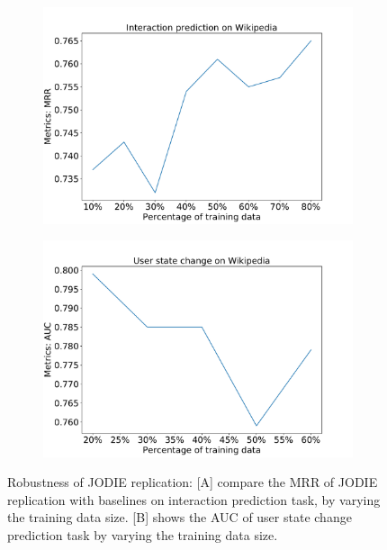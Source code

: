 


\begin{figure}
	\centering
    \begin{subfigure}[b]{0.49\textwidth}
        \includegraphics[width=1\textwidth]{image/wiki.pdf}
    \end{subfigure}
    \begin{subfigure}[b]{0.49\textwidth}
        \includegraphics[width=1\textwidth]{image/wiki_state.pdf}
    \end{subfigure}

    \caption{Robustness of JODIE replication: [A] compare the MRR of JODIE replication with baselines on interaction prediction task, by varying the training data size. [B] shows the AUC of user state change prediction task by varying the training data size.}
    \label{fig:foobar}
\end{figure}

